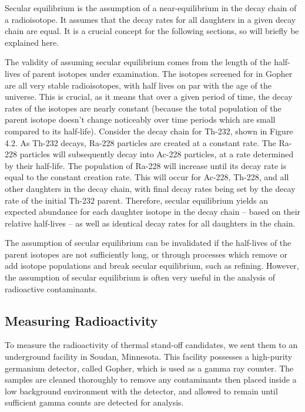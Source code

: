 \documentclass{report}
\begin{document}
Secular equilibrium is the assumption of a near-equilibrium in the decay chain of a radioisotope. It assumes that the decay rates for all daughters in a given decay chain are equal. It is a crucial concept for the following sections, so will briefly be explained here.

The validity of assuming secular equilibrium comes from the length of the half-lives of parent isotopes under examination. The isotopes screened for in Gopher are all very stable radioisotopes, with half lives on par with the age of the universe. This is crucial, as it means that over a given period of time, the decay rates of the isotopes are nearly constant (because the total population of the parent isotope doesn't change noticeably over time periods which are small compared to its half-life). Consider the decay chain for Th-232, shown in Figure 4.2. As Th-232 decays, Ra-228 particles are created at a constant rate. The Ra-228 particles will subsequently decay into Ac-228 particles, at a rate determined by their half-life. The population of Ra-228 will increase until its decay rate is equal to the constant creation rate. This will occur for Ac-228, Th-228, and all other daughters in the decay chain, with final decay rates being set by the decay rate of the initial Th-232 parent. Therefore, secular equilibrium yields an expected abundance for each daughter isotope in the decay chain -- based on their relative half-lives -- as well as identical decay rates for all daughters in the chain.

The assumption of secular equilibrium can be invalidated if the half-lives of the parent isotopes are not sufficiently long, or through processes which remove or add isotope populations and break secular equilibrium, such as refining. However, the assumption of secular equilibrium is often very useful in the analysis of radioactive contaminants.


\subsection{Measuring Radioactivity}
To measure the radioactivity of thermal stand-off candidates, we sent them to an underground facility in Soudan, Minnesota. This facility possesses a high-purity germanium detector, called Gopher, which is used as a gamma ray counter. The samples are cleaned thoroughly to remove any contaminants then placed inside a low background environment with the detector, and allowed to remain until sufficient gamma counts are detected for analysis.
\end{document}
